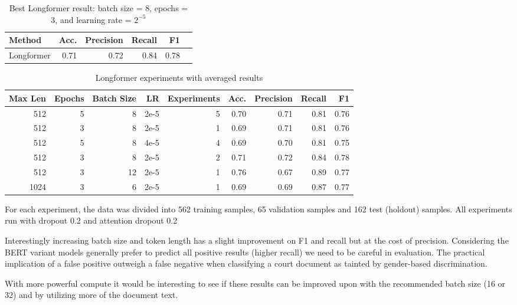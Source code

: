 \documentclass[twocolumn,10pt]{wmrDoc}
\begin{document}
\begin{table}
 \caption{Best Longformer result: batch size = 8, epochs = 3, and learning rate = $2^{-5}$}
  \centering
  \begin{tabular}{lrrrrr}
    \toprule
    Method & Acc. & Precision & Recall & F1\\
    \midrule
    Longformer & 0.71 & 0.72 & 0.84 & 0.78 \\
    \bottomrule
  \end{tabular}
  \label{tab:longformer_best}
\end{table}

\begin{table}
 \caption{Longformer experiments with averaged results}
  \centering
  \begin{tabular}{rrrrrrrrr}
    \toprule
    Max Len & Epochs & Batch Size & LR & Experiments & Acc. & Precision & Recall & F1 \\
    \midrule
    512 & 5 & 8  & 2e-5 & 5 & 0.70 & 0.71 & 0.81 & 0.76 \\
    512 & 3 & 8  & 2e-5 & 1 & 0.69 & 0.71 & 0.81 & 0.76 \\
    512 & 5 & 8  & 4e-5 & 4 & 0.69 & 0.70 & 0.81 & 0.75 \\
    512 & 3 & 8  & 2e-5 & 2 & 0.71 & 0.72 & 0.84 & 0.78 \\
    512 & 3 & 12 & 2e-5 & 1 & 0.76 & 0.67 & 0.89 & 0.77 \\
    1024 & 3 & 6 & 2e-5 & 1 & 0.69 & 0.69 & 0.87 & 0.77 \\
    \bottomrule
  \end{tabular}
  \label{tab:longformer}
\end{table}

For each experiment, the data was divided into 562 training samples, 65 validation samples and 162 test (holdout) samples. All experiments run with dropout 0.2 and attention dropout 0.2

Interestingly increasing batch size and token length has a slight improvement on F1 and recall but at the cost of precision. Considering the BERT variant models generally prefer to predict all positive results (higher recall) we need to be careful in evaluation. The practical implication of a false positive outweigh a false negative when classifying a court document as tainted by gender-based discrimination.

With more powerful compute it would be interesting to see if these results can be improved upon with the recommended batch size (16 or 32) and by utilizing more of the document text.
\end{document}
